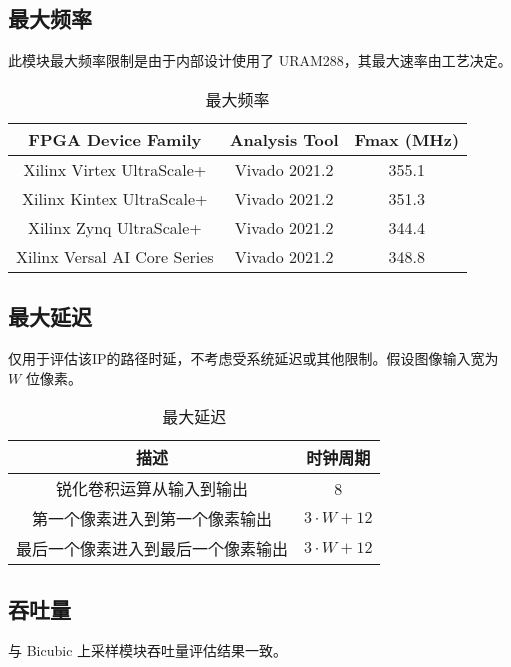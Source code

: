 \documentclass[12pt, a4paper, oneside]{ctexbook}
\begin{document}
		\subsection{最大频率}
		此模块最大频率限制是由于内部设计使用了 URAM288，其最大速率由工艺决定。
		\begin{table}[h]
			\centering
			\begin{tabular}{|c|c|c|}
				\hline
				\textbf{FPGA Device Family}  & \textbf{Analysis Tool} & \textbf{Fmax (MHz)} \\ \hline
				Xilinx Virtex UltraScale+    & Vivado 2021.2          & 355.1               \\ \hline
				Xilinx Kintex UltraScale+    & Vivado 2021.2          & 351.3               \\ \hline
				Xilinx Zynq UltraScale+      & Vivado 2021.2          & 344.4               \\ \hline
				Xilinx Versal AI Core Series & Vivado 2021.2          & 348.8               \\ \hline
			\end{tabular}
		\caption{最大频率}
		\end{table}	
		\newpage
		\subsection{最大延迟}
		仅用于评估该IP的路径时延，不考虑受系统延迟或其他限制。假设图像输入宽为 $W$ 位像素。
		\begin{table}[htb]
			\centering
			\begin{tabular}{|c|c|}
				\hline
				\textbf{描述}       			& \textbf{时钟周期}  			\\ \hline
				锐化卷积运算从输入到输出      	& 8                            \\ \hline
				第一个像素进入到第一个像素输出   & $3\cdot W+12$                \\ \hline
				最后一个像素进入到最后一个像素输出 & $3\cdot W + 12$            \\ \hline
			\end{tabular}
		\caption{最大延迟}
		\end{table}
		\subsection{吞吐量}
		与 Bicubic 上采样模块吞吐量评估结果一致。
\end{document}

